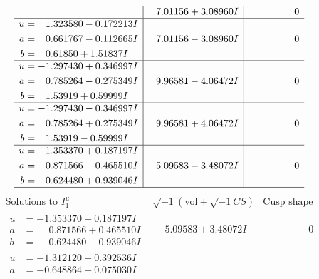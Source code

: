 \documentclass[1p]{elsarticle_modified}
\theoremstyle{definition}
\newcommand{\I}{\sqrt{-1}}
\begin{document}
$$\begin{array}{c|c|c}
 & \phantom{-}7.01156 + 3.08960 I & \phantom{-0.000000 } 0 \\ \hline\begin{aligned}
u &= \phantom{-}1.323580 - 0.172213 I \\
a &= \phantom{-}0.661767 - 0.112665 I \\
b &= \phantom{-}0.61850 + 1.51837 I\end{aligned}
 & \phantom{-}7.01156 - 3.08960 I & \phantom{-0.000000 } 0 \\ \hline\begin{aligned}
u &= -1.297430 + 0.346997 I \\
a &= \phantom{-}0.785264 - 0.275349 I \\
b &= \phantom{-}1.53919 + 0.59999 I\end{aligned}
 & \phantom{-}9.96581 - 4.06472 I & \phantom{-0.000000 } 0 \\ \hline\begin{aligned}
u &= -1.297430 - 0.346997 I \\
a &= \phantom{-}0.785264 + 0.275349 I \\
b &= \phantom{-}1.53919 - 0.59999 I\end{aligned}
 & \phantom{-}9.96581 + 4.06472 I & \phantom{-0.000000 } 0 \\ \hline\begin{aligned}
u &= -1.353370 + 0.187197 I \\
a &= \phantom{-}0.871566 - 0.465510 I \\
b &= \phantom{-}0.624480 + 0.939046 I\end{aligned}
 & \phantom{-}5.09583 - 3.48072 I & \phantom{-0.000000 } 0\\
 \hline 
 \end{array}$$\newpage$$\begin{array}{c|c|c}  
\text{Solutions to }I^u_{1}& \I (\text{vol} + \sqrt{-1}CS) & \text{Cusp shape}\\
 \hline 
\begin{aligned}
u &= -1.353370 - 0.187197 I \\
a &= \phantom{-}0.871566 + 0.465510 I \\
b &= \phantom{-}0.624480 - 0.939046 I\end{aligned}
 & \phantom{-}5.09583 + 3.48072 I & \phantom{-0.000000 } 0 \\ \hline\begin{aligned}
u &= -1.312120 + 0.392536 I \\
a &= -0.648864 - 0.075030 I \\

\end{aligned}
\end{array}$$
\end{document}
